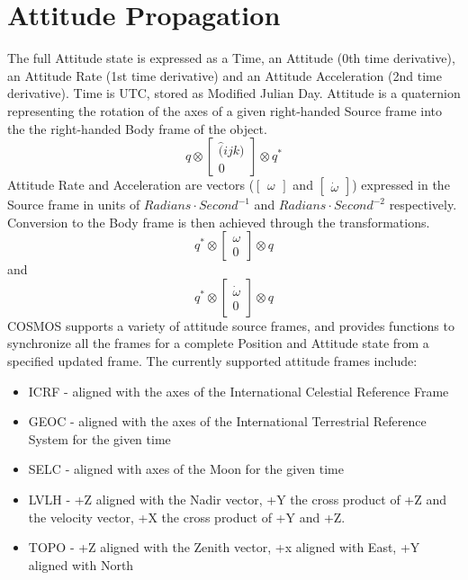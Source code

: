 \documentclass[12pt,letterpaper]{paper}
\begin{document}
\section{Attitude Propagation}
The full Attitude state is expressed as a Time, an Attitude (0th time derivative), an Attitude Rate (1st time derivative) and an Attitude Acceleration (2nd time derivative). Time is UTC, stored as Modified Julian Day. Attitude is a quaternion representing the rotation of the axes of a given right-handed Source frame into the the right-handed Body frame of the object.
\[q \otimes \begin{bmatrix} \hat(ijk)\\0 \end{bmatrix} \otimes q^{*}\]
Attitude Rate and Acceleration are vectors ($\begin{bmatrix}\omega\end{bmatrix}$ and $\begin{bmatrix}\dot{\omega}\end{bmatrix}$) expressed in the Source frame in units of $Radians \cdot Second^{-1}$ and $Radians \cdot Second^{-2}$ respectively. Conversion to the Body frame is then achieved through the transformations.
\[q^{*} \otimes \begin{bmatrix} \omega\\0 \end{bmatrix} \otimes q\] and \[q^{*} \otimes \begin{bmatrix} \dot{\omega}\\0 \end{bmatrix} \otimes q\]
COSMOS supports a variety of attitude source frames, and provides functions to synchronize all the frames for a complete Position and Attitude state from a specified updated frame. The currently supported attitude frames include:
\begin{itemize}
\item ICRF - aligned with the axes of the International Celestial Reference Frame
\item GEOC - aligned with the axes of the International Terrestrial Reference System for the given time
\item SELC - aligned with axes of the Moon for the given time
\item LVLH - +Z aligned with the Nadir vector, +Y the cross product of +Z and the velocity vector, +X the cross product of +Y and +Z.
\item TOPO - +Z aligned with the Zenith vector, +x aligned with East, +Y aligned with North
\end{itemize}
\end{document}
